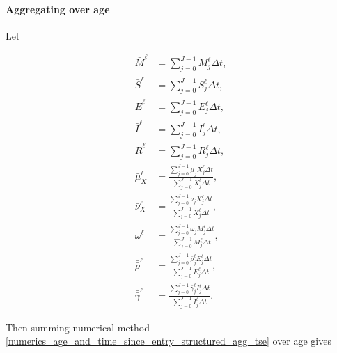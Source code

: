 \documentclass{jpmarticle}
\let\subequationsorig\subequations%
\let\endsubequationsorig\endsubequations%
\renewenvironment{subequations}{
  \subequationsorig
  \renewcommand{\theequation}{\theparentequation.\arabic{equation}}
}{
  \endsubequationsorig
}
\begin{document}
\paragraph{Aggregating over age}

Let
\begin{subequations}
  \begin{align}
    \bar{M}^{\ell} &= \sum_{j = 0}^{J - 1} M_j^{\ell} \Delta t,
    \\
    \bar{S}^{\ell} &= \sum_{j = 0}^{J - 1} S_j^{\ell} \Delta t,
    \\
    \bar{E}^{\ell} &= \sum_{j = 0}^{J - 1} E_j^{\ell} \Delta t,
    \\
    \bar{I}^{\ell} &= \sum_{j = 0}^{J - 1} I_j^{\ell} \Delta t,
    \\
    \bar{R}^{\ell} &= \sum_{j = 0}^{J - 1} R_j^{\ell} \Delta t,
    \\
    \bar{\mu}_X^{\ell}
    &= \frac{\sum_{j = 0}^{J - 1} \mu_j X_j^{\ell} \Delta t}
    {\sum_{j = 0}^{J - 1} X_j^{\ell} \Delta t},
    \\
    \bar{\nu}_X^{\ell}
    &= \frac{\sum_{j = 0}^{J - 1} \nu_j X_j^{\ell} \Delta t}
    {\sum_{j = 0}^{J - 1} X_j^{\ell} \Delta t},
    \\
    \bar{\omega}^{\ell}
    &= \frac{\sum_{j = 0}^{J - 1} \omega_j M_j^{\ell} \Delta t}
    {\sum_{j = 0}^{J - 1} M_j^{\ell} \Delta t},
    \\
    \bar{\bar{\rho}}^{\ell}
    &= \frac{\sum_{j = 0}^{J - 1} \bar{\rho}_j^{\ell} E_j^{\ell} \Delta t}
    {\sum_{j = 0}^{J - 1} E_j^{\ell} \Delta t},
    \\
    \bar{\bar{\gamma}}^{\ell}
    &= \frac{\sum_{j = 0}^{J - 1} \bar{\gamma}_j^{\ell} I_j^{\ell} \Delta t}
    {\sum_{j = 0}^{J - 1} I_j^{\ell} \Delta t}.
  \end{align}
\end{subequations}
Then summing numerical method
\eqref{numerics_age_and_time_since_entry_structured_agg_tse} over
age gives
\end{document}
